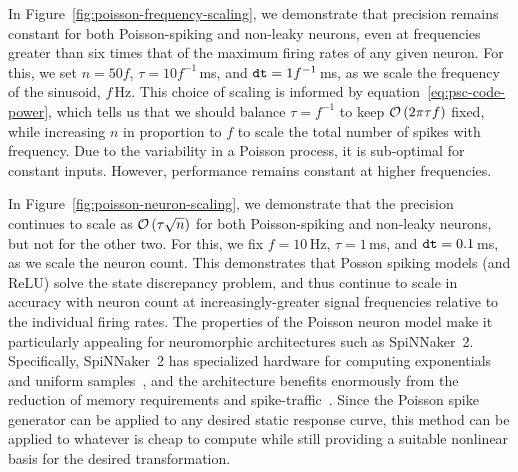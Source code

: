 In Figure~\ref{fig:poisson-frequency-scaling}, we demonstrate that precision remains constant for both Poisson-spiking and non-leaky neurons, even at frequencies greater than six times that of the maximum firing rates of any given neuron.
For this, we set $n = 50 f$, $\tau = 10 f^{-1}$\,ms, and $\texttt{dt}{} = 1 f^{-1}$\,ms, as we scale the frequency of the sinusoid, $f$\,Hz.
This choice of scaling is informed by equation~\ref{eq:psc-code-power}, which tells us that we should balance $\tau = f^{-1}$ to keep $\mathcal{O}\left({2 \pi \tau f }\right)$ fixed, while increasing $n$ in proportion to $f$ to scale the total number of spikes with frequency.
Due to the variability in a Poisson process, it is sub-optimal for constant inputs.
However, performance remains constant at higher frequencies.

In Figure~\ref{fig:poisson-neuron-scaling}, we demonstrate that the precision continues to scale as $\mathcal{O}\left({\tau \sqrt{n}}\right)$ for both Poisson-spiking and non-leaky neurons, but not for the other two.
For this, we fix $f = 10$\,Hz, $\tau = 1$\,ms, and $\texttt{dt}{} = 0.1$\,ms, as we scale the neuron count.
This demonstrates that Posson spiking models (and ReLU) solve the state discrepancy problem, and thus continue to scale in accuracy with neuron count at increasingly-greater signal frequencies relative to the individual firing rates.
The properties of the Poisson neuron model make it particularly appealing for neuromorphic architectures such as SpiNNaker~2.
Specifically, SpiNNaker~2 has specialized hardware for computing exponentials~\citep{partzsch2017fixed} and uniform samples~\citep{liu2018memory}, and the architecture benefits enormously from the reduction of memory requirements and spike-traffic~\citep{stromatias2013power, mundy2015}.
Since the Poisson spike generator can be applied to any desired static response curve, this method can be applied to whatever is cheap to compute while still providing a suitable nonlinear basis for the desired transformation.

